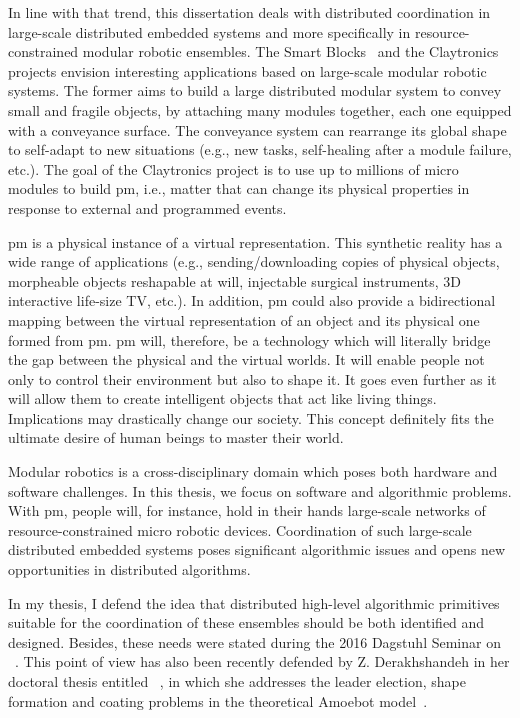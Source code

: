 In line with that trend, this dissertation deals with distributed coordination in large-scale distributed embedded systems and more specifically in resource-constrained modular robotic ensembles. The Smart Blocks~\cite{piranda2013new} and the Claytronics~\cite{goldstein-waci04} projects envision interesting applications based on large-scale modular robotic systems. The former aims to build a large distributed modular system to convey small and fragile objects, by attaching many modules together, each one equipped with a conveyance surface. The conveyance system can rearrange its global shape to self-adapt to new situations (e.g., new tasks, self-healing after a module failure, etc.). The goal of the Claytronics project is to use up to millions of micro modules to build \gls{pm}, i.e., matter that can change its physical properties in response to external and programmed events.

\gls{pm} is a physical instance of a virtual representation. This synthetic reality has a wide range of applications (e.g., sending/downloading copies of physical objects, morpheable objects reshapable at will, injectable surgical instruments, 3D interactive life-size TV, etc.). In addition, \gls{pm} could also provide a bidirectional mapping between the virtual representation of an object and its physical one formed from \gls{pm}. \gls{pm} will, therefore, be a technology which will literally bridge the gap between the physical and the virtual worlds. It will enable people not only to control their environment but also to shape it. It goes even further as it will allow them to create intelligent objects that act like living things. Implications may drastically change our society. This concept definitely fits the ultimate desire of human beings to master their world.

Modular robotics is a cross-disciplinary domain which poses both hardware and software challenges. In this thesis, we focus on software and algorithmic problems. With \gls{pm}, people will, for instance, hold in their hands large-scale networks of resource-constrained micro robotic devices. Coordination of such large-scale distributed embedded systems poses significant algorithmic issues and opens new opportunities in distributed algorithms.

In my thesis, I defend the idea that distributed high-level algorithmic primitives suitable for the coordination of these ensembles should be both identified and designed. Besides, these needs were stated during the 2016 Dagstuhl Seminar on ~\cite{fekete2016algorithmic}. This point of view has also been recently defended by Z. Derakhshandeh in her doctoral thesis entitled ~\cite{derakhshandeh2017algorithmic}, in which she addresses the leader election, shape formation and coating problems in the theoretical Amoebot model~\cite{derakhshandeh2014brief}.


